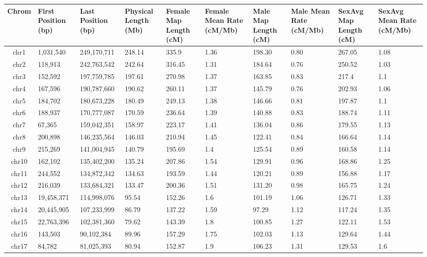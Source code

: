 \begin{table}[!h] \centering
    \footnotesize
    \begin{tabular}{|cp{1.0cm}p{1.4cm}p{1.1cm}p{1.1cm}p{1.0cm}p{1.1cm}p{1.0cm}p{1.1cm}p{1.0cm}|}
        \hline 
Chrom & First Position (bp) & Last Position (bp) & Physical Length (Mb) & Female Map Length (cM) & Female Mean Rate (cM/Mb) & Male Map Length (cM) & Male Mean Rate (cM/Mb) & SexAvg Map Length (cM) & SexAvg Mean Rate (cM/Mb) \\ \hline
chr1 & 1,031,540 & 249,170,711 & 248.14 & 335.9 & 1.36 & 198.30 & 0.80 & 267.05 & 1.08 \\
chr2 & 118,913 & 242,763,542 & 242.64 & 316.45 & 1.31 & 184.64 & 0.76 & 250.52 & 1.03 \\
chr3 & 152,592 & 197,759,785 & 197.61 & 270.98 & 1.37 & 163.85 & 0.83 & 217.4 & 1.1 \\
chr4 & 167,596 & 190,787,660 & 190.62 & 260.11 & 1.37 & 145.79 & 0.76 & 202.93 & 1.06 \\
chr5 & 184,702 & 180,673,228 & 180.49 & 249.13 & 1.38 & 146.66 & 0.81 & 197.87 & 1.1 \\
chr6 & 188,937 & 170,777,087 & 170.59 & 236.64 & 1.39 & 140.88 & 0.83 & 188.74 & 1.11 \\
chr7 & 67,365 & 159,042,351 & 158.97 & 223.17 & 1.41 & 136.04 & 0.86 & 179.55 & 1.13 \\
chr8 & 200,898 & 146,235,564 & 146.03 & 210.94 & 1.45 & 122.41 & 0.84 & 166.64 & 1.14 \\
chr9 & 215,269 & 141,004,945 & 140.79 & 195.69 & 1.4 & 125.54 & 0.89 & 160.58 & 1.14 \\
chr10 & 162,102 & 135,402,200 & 135.24 & 207.86 & 1.54 & 129.91 & 0.96 & 168.86 & 1.25 \\
chr11 & 244,552 & 134,872,342 & 134.63 & 193.59 & 1.44 & 120.21 & 0.89 & 156.88 & 1.17 \\
chr12 & 216,039 & 133,684,321 & 133.47 & 200.36 & 1.51 & 131.20 & 0.98 & 165.75 & 1.24 \\
chr13 & 19,458,371 & 114,998,076 & 95.54 & 152.26 & 1.6 & 101.19 & 1.06 & 126.71 & 1.33 \\
chr14 & 20,445,905 & 107,233,999 & 86.79 & 137.22 & 1.59 & 97.29 & 1.12 & 117.24 & 1.35 \\
chr15 & 22,763,396 & 102,381,360 & 79.62 & 143.39 & 1.8 & 100.85 & 1.27 & 122.11 & 1.53 \\
chr16 & 143,503 & 90,102,384 & 89.96 & 157.29 & 1.75 & 102.03 & 1.13 & 129.64 & 1.44 \\
chr17 & 84,782 & 81,025,393 & 80.94 & 152.87 & 1.9 & 106.23 & 1.31 & 129.53 & 1.6 \\

\end{tabular}
\end{table}
